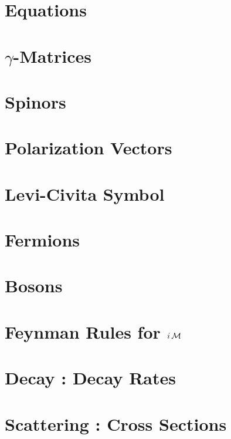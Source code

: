 \documentclass[landscape,8pt,a4paper,english]{extarticle}
\begin{document}
\begin{multicols}{3}\centering
        \section*{Equations}
        \section*{$\gamma$-Matrices}
        \section*{Spinors}
        \section*{Polarization Vectors}
        \section*{Levi-Civita Symbol}
        \section*{Fermions}
        \section*{Bosons}
        \section*{Feynman Rules for $i\operatorname{\mathcal{M}}$}
        \section*{Decay : Decay Rates}
        \section*{Scattering : Cross Sections}
\end{multicols}
\end{document}
